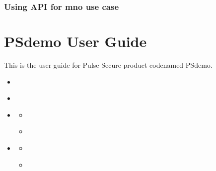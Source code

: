 \documentclass[letterpaper,10pt,english]{sphinxmanual}
\begin{document}
\subsection{Using API for mno use case}
\label{\detokenize{dev-guide:using-api-for-mno-use-case}}

\chapter{PSdemo User Guide}
\label{\detokenize{user-guide:product-name-user-guide}}\label{\detokenize{user-guide:doc-user-guide}}\label{\detokenize{user-guide::doc}}
This is the user guide for Pulse Secure product codenamed PSdemo.

\begin{sphinxShadowBox}
\begin{itemize}
\item {} 
\label{\detokenize{user-guide:id1}}{\hyperref[\detokenize{user-guide:revision-history}]{}}

\item {} 
\label{\detokenize{user-guide:id2}}{\hyperref[\detokenize{user-guide:introduction}]{}}

\item {} 
\label{\detokenize{user-guide:id3}}{\hyperref[\detokenize{user-guide:section-a}]{}}
\begin{itemize}
\item {} 
\label{\detokenize{user-guide:id4}}{\hyperref[\detokenize{user-guide:part-1}]{}}

\item {} 
\label{\detokenize{user-guide:id5}}{\hyperref[\detokenize{user-guide:part-2}]{}}

\end{itemize}

\item {} 
\label{\detokenize{user-guide:id6}}{\hyperref[\detokenize{user-guide:section-b}]{}}
\begin{itemize}
\item {} 
\label{\detokenize{user-guide:id7}}{\hyperref[\detokenize{user-guide:how-to-do-xyz}]{}}

\item {} 
\label{\detokenize{user-guide:id8}}{\hyperref[\detokenize{user-guide:how-to-setup-mno}]{}}

\end{itemize}

\end{itemize}
\end{sphinxShadowBox}
\end{document}
